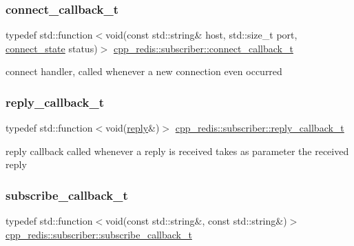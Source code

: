\subsubsection{\texorpdfstring{connect\+\_\+callback\+\_\+t}{connect\_callback\_t}}
{\footnotesize\ttfamily typedef std\+::function$<$void(const std\+::string\& host, std\+::size\+\_\+t port, \hyperlink{classcpp__redis_1_1subscriber_afc976757efd9d0ac4def6935546a2338}{connect\+\_\+state} status)$>$ \hyperlink{classcpp__redis_1_1subscriber_a90f2f7d4c748c3c2e89d1e977fa6dce1}{cpp\+\_\+redis\+::subscriber\+::connect\+\_\+callback\+\_\+t}}

connect handler, called whenever a new connection even occurred \mbox{\label{classcpp__redis_1_1subscriber_a99d220cc662664e2399b709f61ac9581}} 
\subsubsection{\texorpdfstring{reply\+\_\+callback\+\_\+t}{reply\_callback\_t}}
{\footnotesize\ttfamily typedef std\+::function$<$void(\hyperlink{classcpp__redis_1_1reply}{reply}\&)$>$ \hyperlink{classcpp__redis_1_1subscriber_a99d220cc662664e2399b709f61ac9581}{cpp\+\_\+redis\+::subscriber\+::reply\+\_\+callback\+\_\+t}}

reply callback called whenever a reply is received takes as parameter the received reply \mbox{\label{classcpp__redis_1_1subscriber_ac6ab8ebc526d784e4b79a39bbd73dca8}} 
\subsubsection{\texorpdfstring{subscribe\+\_\+callback\+\_\+t}{subscribe\_callback\_t}}
{\footnotesize\ttfamily typedef std\+::function$<$void(const std\+::string\&, const std\+::string\&)$>$ \hyperlink{classcpp__redis_1_1subscriber_ac6ab8ebc526d784e4b79a39bbd73dca8}{cpp\+\_\+redis\+::subscriber\+::subscribe\+\_\+callback\+\_\+t}}

